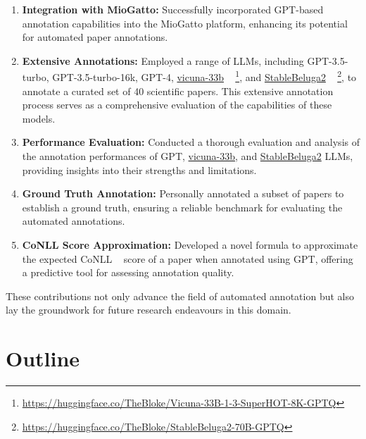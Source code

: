 \begin{enumerate}
    \item \textbf{Integration with MioGatto:} Successfully incorporated GPT-based annotation capabilities into the MioGatto platform, enhancing its potential for automated paper annotations.
    
    \item \textbf{Extensive Annotations:} Employed a range of LLMs, including GPT-3.5-turbo, GPT-3.5-turbo-16k, GPT-4, \href{https://huggingface.co/TheBloke/Vicuna-33B-1-3-SuperHOT-8K-GPTQ}{vicuna-33b} ~\parencite{zheng2023judging} \footnote{\url{https://huggingface.co/TheBloke/Vicuna-33B-1-3-SuperHOT-8K-GPTQ}}, and \href{https://huggingface.co/TheBloke/StableBeluga2-70B-GPTQ}{StableBeluga2} ~\parencite{StableBelugaModels, touvron2023llama, mukherjee2023orca} \footnote{\url{https://huggingface.co/TheBloke/StableBeluga2-70B-GPTQ}}, to annotate a curated set of 40 scientific papers. This extensive annotation process serves as a comprehensive evaluation of the capabilities of these models.
    
    \item \textbf{Performance Evaluation:} Conducted a thorough evaluation and analysis of the annotation performances of GPT, \href{https://huggingface.co/TheBloke/Vicuna-33B-1-3-SuperHOT-8K-GPTQ}{vicuna-33b}, and \href{https://huggingface.co/TheBloke/StableBeluga2-70B-GPTQ}{StableBeluga2} LLMs, providing insights into their strengths and limitations.
    
    \item \textbf{Ground Truth Annotation:} Personally annotated a subset of papers to establish a ground truth, ensuring a reliable benchmark for evaluating the automated annotations.
    
    \item \textbf{CoNLL Score Approximation:} Developed a novel formula to approximate the expected CoNLL ~\parencite{pradhan2012conll} score of a paper when annotated using GPT, offering a predictive tool for assessing annotation quality.
\end{enumerate}

These contributions not only advance the field of automated annotation but also lay the groundwork for future research endeavours in this domain.

\section{Outline}

